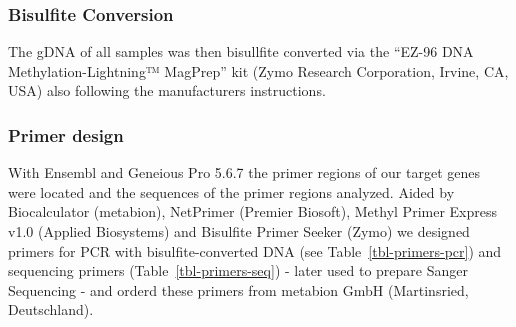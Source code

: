 \documentclass[
  letterpaper,
  DIV=11,
  numbers=noendperiod]{scrartcl}
\begin{document}
\subsubsection{Bisulfite Conversion}\label{bisulfite-conversion}

The gDNA of all samples was then bisullfite converted via the ``EZ-96
DNA Methylation-Lightning™ MagPrep'' kit (Zymo Research Corporation,
Irvine, CA, USA) also following the manufacturers instructions.

\subsubsection{Primer design}\label{primer-design}

With Ensembl and Geneious Pro 5.6.7 the primer regions of our target
genes were located and the sequences of the primer regions analyzed.
Aided by Biocalculator (metabion), NetPrimer (Premier Biosoft), Methyl
Primer Express v1.0 (Applied Biosystems) and Bisulfite Primer Seeker
(Zymo) we designed primers for PCR with bisulfite-converted DNA (see
Table~\ref{tbl-primers-pcr}) and sequencing primers
(Table~\ref{tbl-primers-seq}) - later used to prepare Sanger Sequencing
- and orderd these primers from metabion GmbH (Martinsried,
Deutschland).
\end{document}
